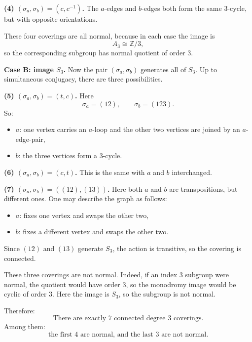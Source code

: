 \begin{solution}
\par

\textbf{(4) \((\sigma_a,\sigma_b)=(c,c^{-1})\).}
The \(a\)-edges and \(b\)-edges both form the same \(3\)-cycle, but with opposite orientations.

\par

These four coverings are all normal, because in each case the image is
\[
A_3\cong \mathbb Z/3,
\]
so the corresponding subgroup has normal quotient of order \(3\).

\par

\textbf{Case B: image \(S_3\).}
Now the pair \((\sigma_a,\sigma_b)\) generates all of \(S_3\). Up to simultaneous conjugacy, there are three possibilities.

\par

\textbf{(5) \((\sigma_a,\sigma_b)=(t,c)\).}
Here
\[
\sigma_a=(12),\qquad \sigma_b=(123).
\]
So:
\begin{itemize}
	\item \(a\): one vertex carries an \(a\)-loop and the other two vertices are joined by an \(a\)-edge-pair,
	\item \(b\): the three vertices form a \(3\)-cycle.
\end{itemize}

\par

\textbf{(6) \((\sigma_a,\sigma_b)=(c,t)\).}
This is the same with \(a\) and \(b\) interchanged.

\par

\textbf{(7) \((\sigma_a,\sigma_b)=((12),(13))\).}
Here both \(a\) and \(b\) are transpositions, but different ones. One may describe the graph as follows:
\begin{itemize}
	\item \(a\): fixes one vertex and swaps the other two,
	\item \(b\): fixes a different vertex and swaps the other two.
\end{itemize}
Since \((12)\) and \((13)\) generate \(S_3\), the action is transitive, so the covering is connected.

\par

These three coverings are not normal. Indeed, if an index \(3\) subgroup were normal, the quotient would have order \(3\), so the monodromy image would be cyclic of order \(3\). Here the image is \(S_3\), so the subgroup is not normal.

Therefore:
\[
\boxed{\text{There are exactly \(7\) connected degree \(3\) coverings.}}
\]
Among them:
\[
\boxed{\text{the first \(4\) are normal, and the last \(3\) are not normal.}}
\]

\par
\end{solution}

